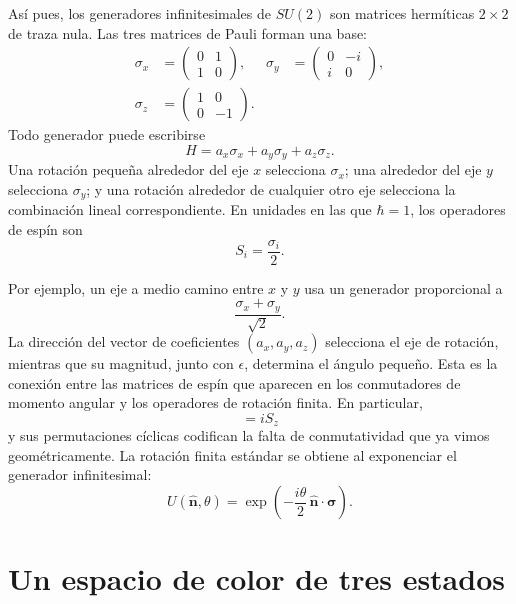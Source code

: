 Así pues, los generadores infinitesimales de \(SU(2)\) son matrices hermíticas \(2\times2\) de traza nula. Las tres matrices de Pauli forman una base:
\begin{equation}
\begin{aligned}
\sigma_x&=
\begin{pmatrix}0&1\\1&0\end{pmatrix},
&
\sigma_y&=
\begin{pmatrix}0&-i\\i&0\end{pmatrix},
\\[0.4em]
\sigma_z&=
\begin{pmatrix}1&0\\0&-1\end{pmatrix}.
\end{aligned}
\end{equation}
Todo generador puede escribirse
\begin{equation}
H=a_x\sigma_x+a_y\sigma_y+a_z\sigma_z.
\end{equation}
Una rotación pequeña alrededor del eje \(x\) selecciona \(\sigma_x\); una alrededor del eje \(y\) selecciona \(\sigma_y\); y una rotación alrededor de cualquier otro eje selecciona la combinación lineal correspondiente. En unidades en las que \(\hbar=1\), los operadores de espín son
\begin{equation}
S_i=\frac{\sigma_i}{2}.
\end{equation}

Por ejemplo, un eje a medio camino entre \(x\) y \(y\) usa un generador proporcional a
\begin{equation}
\frac{\sigma_x+\sigma_y}{\sqrt2}.
\end{equation}
La dirección del vector de coeficientes \((a_x,a_y,a_z)\) selecciona el eje de rotación, mientras que su magnitud, junto con \(\epsilon\), determina el ángulo pequeño. Esta es la conexión entre las matrices de espín que aparecen en los conmutadores de momento angular y los operadores de rotación finita. En particular,
\begin{equation}
[S_x,S_y]=iS_z
\end{equation}
y sus permutaciones cíclicas codifican la falta de conmutatividad que ya vimos geométricamente. La rotación finita estándar se obtiene al exponenciar el generador infinitesimal:
\begin{equation}
U(\hat{\boldsymbol n},\theta)
=\exp\left(-\frac{i\theta}{2}\,
\hat{\boldsymbol n}\cdot\boldsymbol\sigma\right).
\end{equation}\section{Un espacio de color de tres estados}

